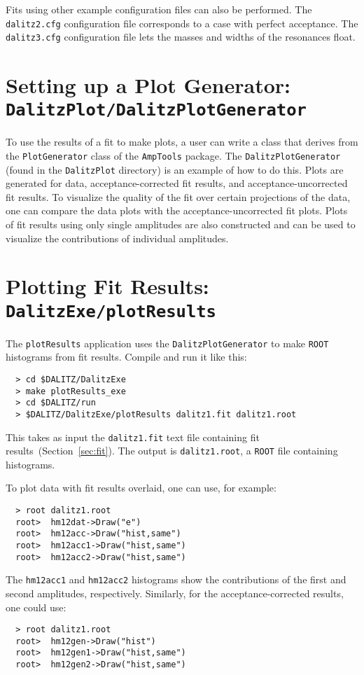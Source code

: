 \documentclass[10pt]{article}
\begin{document}
Fits using other example configuration files can also be performed.  The {\tt dalitz2.cfg} configuration file corresponds to a case with perfect acceptance.  The {\tt dalitz3.cfg} configuration file lets the masses and widths of the resonances float.

\section{Setting up a Plot Generator: \\
{\tt DalitzPlot/DalitzPlotGenerator}}
\label{sec:dpg}

To use the results of a fit to make plots, a user can write a class that derives from the {\tt PlotGenerator} class of the {\tt AmpTools} package.  The {\tt DalitzPlotGenerator} (found in the {\tt DalitzPlot} directory) is an example of how to do this.  Plots are generated for data, acceptance-corrected fit results, and acceptance-uncorrected fit results.  To visualize the quality of the fit over certain projections of the data, one can compare the data plots with the acceptance-uncorrected fit plots.  Plots of fit results using only single amplitudes are also constructed and can be used to visualize the contributions of individual amplitudes.


\section{Plotting Fit Results: \\
{\tt DalitzExe/plotResults}}

The {\tt plotResults} application uses the {\tt DalitzPlotGenerator} to make {\tt ROOT} histograms from fit results.  Compile and run it like this:
\begin{verbatim}
  > cd $DALITZ/DalitzExe
  > make plotResults_exe
  > cd $DALITZ/run
  > $DALITZ/DalitzExe/plotResults dalitz1.fit dalitz1.root
\end{verbatim}
This takes as input the {\tt dalitz1.fit} text file containing fit results~(Section~\ref{sec:fit}).  The output is {\tt dalitz1.root}, a {\tt ROOT} file containing histograms.

To plot data with fit results overlaid, one can use, for example:
\begin{verbatim}
  > root dalitz1.root
  root>  hm12dat->Draw("e")
  root>  hm12acc->Draw("hist,same")
  root>  hm12acc1->Draw("hist,same")
  root>  hm12acc2->Draw("hist,same")
\end{verbatim}
The {\tt hm12acc1} and {\tt hm12acc2} histograms show the contributions of the first and second amplitudes, respectively.  Similarly, for the acceptance-corrected results, one could use:
\begin{verbatim}
  > root dalitz1.root
  root>  hm12gen->Draw("hist")
  root>  hm12gen1->Draw("hist,same")
  root>  hm12gen2->Draw("hist,same")
\end{verbatim}
\end{document}
